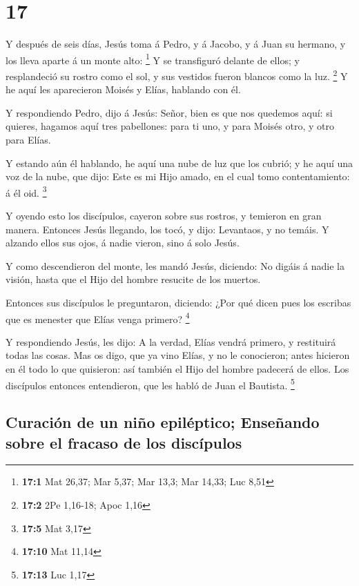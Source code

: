 \hypertarget{section-16}{%
\section{17}\label{section-16}}

 Y después de seis días, Jesús toma á Pedro, y á Jacobo, y
á Juan su hermano, y los lleva aparte á un monte alto: \footnote{\textbf{17:1}
  Mat 26,37; Mar 5,37; Mar 13,3; Mar 14,33; Luc 8,51}  Y
se transfiguró delante de ellos; y resplandeció su rostro como el sol, y
sus vestidos fueron blancos como la luz. \footnote{\textbf{17:2} 2Pe
  1,16-18; Apoc 1,16}  Y he aquí les aparecieron Moisés y
Elías, hablando con él.

 Y respondiendo Pedro, dijo á Jesús: Señor, bien es que
nos quedemos aquí: si quieres, hagamos aquí tres pabellones: para ti
uno, y para Moisés otro, y otro para Elías.

 Y estando aún él hablando, he aquí una nube de luz que
los cubrió; y he aquí una voz de la nube, que dijo: Este es mi Hijo
amado, en el cual tomo contentamiento: á él oid. \footnote{\textbf{17:5}
  Mat 3,17}

 Y oyendo esto los discípulos, cayeron sobre sus rostros,
y temieron en gran manera.  Entonces Jesús llegando, los
tocó, y dijo: Levantaos, y no temáis.  Y alzando ellos sus
ojos, á nadie vieron, sino á solo Jesús.

 Y como descendieron del monte, les mandó Jesús, diciendo:
No digáis á nadie la visión, hasta que el Hijo del hombre resucite de
los muertos.

 Entonces sus discípulos le preguntaron, diciendo: ¿Por
qué dicen pues los escribas que es menester que Elías venga primero?
\footnote{\textbf{17:10} Mat 11,14}

 Y respondiendo Jesús, les dijo: A la verdad, Elías
vendrá primero, y restituirá todas las cosas.  Mas os
digo, que ya vino Elías, y no le conocieron; antes hicieron en él todo
lo que quisieron: así también el Hijo del hombre padecerá de ellos.
 Los discípulos entonces entendieron, que les habló de
Juan el Bautista. \footnote{\textbf{17:13} Luc 1,17}

\hypertarget{curaciuxf3n-de-un-niuxf1o-epiluxe9ptico-enseuxf1ando-sobre-el-fracaso-de-los-discuxedpulos}{%
\subsection{Curación de un niño epiléptico; Enseñando sobre el fracaso
de los
discípulos}\label{curaciuxf3n-de-un-niuxf1o-epiluxe9ptico-enseuxf1ando-sobre-el-fracaso-de-los-discuxedpulos}}

